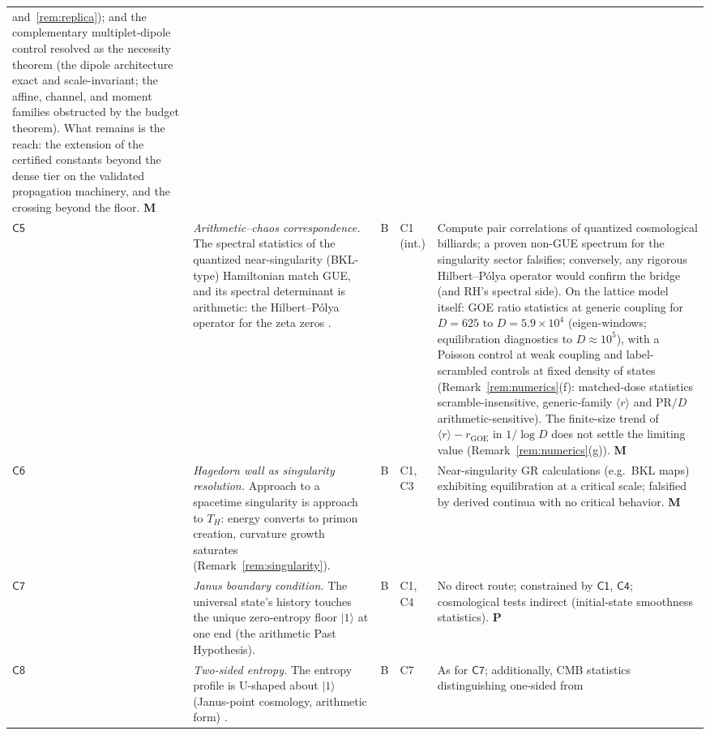\documentclass[11pt,a4paper]{article}
\theoremstyle{plain}
\theoremstyle{definition}
\theoremstyle{remark}
\newcommand{\ket}[1]{\lvert #1\rangle}
\begin{document}
\begin{longtable}{@{}p{}p{}p{}p{}p{}@{}}
and~\ref{rem:replica}); and the complementary multiplet-dipole control resolved
as the necessity theorem (the dipole architecture exact and scale-invariant; the
affine, channel, and moment families obstructed by the budget theorem). What
remains is the reach: the extension of the certified
constants beyond the dense tier on the validated propagation machinery, and the
crossing beyond the floor. \textbf{M}\\
$\mathsf{C5}$ &
\emph{Arithmetic--chaos correspondence.} The spectral statistics of the quantized
near-singularity (BKL-type) Hamiltonian match GUE, and its spectral determinant is
arithmetic: the Hilbert--P\'olya operator for the zeta zeros
\cite{berrykeating1999,montgomery1973,odlyzko1987}. &
B &
C1 (int.) &
Compute pair correlations of quantized cosmological billiards; a proven non-GUE
spectrum for the singularity sector falsifies; conversely, any rigorous Hilbert--P\'olya
operator would confirm the bridge (and RH's spectral side). On the lattice model itself:
GOE ratio statistics at generic coupling for $D=625$ to
$D=5.9\times10^{4}$ (eigen-windows; equilibration diagnostics to $D\approx10^{5}$),
with a Poisson control at weak coupling and label-scrambled controls at fixed density of
states (Remark~\ref{rem:numerics}(f): matched-dose statistics scramble-insensitive,
generic-family $\langle r\rangle$ and $\mathrm{PR}/D$ arithmetic-sensitive). The finite-size
trend of $\langle r\rangle-r_{\mathrm{GOE}}$ in $1/\log D$ does not settle the limiting
value (Remark~\ref{rem:numerics}(g)). \textbf{M}\\
$\mathsf{C6}$ &
\emph{Hagedorn wall as singularity resolution.} Approach to a spacetime singularity is
approach to $T_{H}$: energy converts to primon creation, curvature growth saturates
(Remark~\ref{rem:singularity}). &
B &
C1, C3 &
Near-singularity GR calculations (e.g.\ BKL maps) exhibiting equilibration at a critical
scale; falsified by derived continua with no critical behavior. \textbf{M}\\
$\mathsf{C7}$ &
\emph{Janus boundary condition.} The universal state's history touches the unique
zero-entropy floor $\ket{1}$ at one end (the arithmetic Past Hypothesis). &
B &
C1, C4 &
No direct route; constrained by $\mathsf{C1}$, $\mathsf{C4}$; cosmological
tests indirect (initial-state smoothness statistics). \textbf{P}\\
$\mathsf{C8}$ &
\emph{Two-sided entropy.} The entropy profile is U-shaped about $\ket{1}$ (Janus-point
cosmology, arithmetic form) \cite{barbour2016,carrollchen2005}. &
B &
C7 &
As for $\mathsf{C7}$; additionally, CMB statistics distinguishing one-sided from

\end{longtable}
\end{document}
